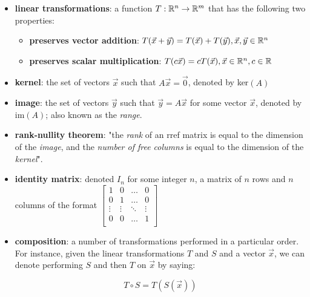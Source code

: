 \documentclass[12pt]{article}
\begin{document}
{{\begin{itemize}
        Note that in either view, the answers are equivalent, and using one view or the other simply helps make particular operations easier.
        
        \item \textbf{linear transformations}: a function $T: \mathbb{R}^n \to \mathbb{R}^m$ that has the following two properties:
        \begin{itemize}
            \item \textbf{preserves vector addition}: $T(\Vec{x} + \Vec{y}) = T(\Vec{x}) + T(\Vec{y}), \Vec{x}, \Vec{y} \in \mathbb{R}^n$
            \item \textbf{preserves scalar multiplication}: $T(c \Vec{x}) = c T(\Vec{x}), \Vec{x}\in\mathbb{R}^n, c\in\mathbb{R}$
        \end{itemize}
        
        \item \textbf{kernel}: the set of vectors $\Vec{x}$ such that $A\Vec{x} = \Vec{0}$, denoted by ker$(A)$
        
        \item \textbf{image}: the set of vectors $\Vec{y}$ such that $\Vec{y} = A\Vec{x}$ for some vector $\Vec{x}$, denoted by im$(A)$; also known as the \textit{range}.
        
        \item \textbf{rank-nullity theorem}: "the \textit{rank} of an rref matrix is equal to the dimension of the \textit{image}, and the \textit{number of free columns} is equal to the dimension of the \textit{kernel}".
        
        \item \textbf{identity matrix}: denoted $I_n$ for some integer $n$, a matrix of $n$ rows and $n$ columns of the format $\begin{bmatrix}
        1 & 0 & \dots & 0\\
        0 & 1 & \dots & 0\\
        \vdots & \vdots & \ddots & \vdots \\
        0 & 0 & \dots & 1 \\
        \end{bmatrix}$

        \item \textbf{composition}: a number of transformations performed in a particular order. For instance, given the linear transformations $T$ and $S$ and a vector $\vec{x}$, we can denote performing $S$ and then $T$ on $\vec{x}$ by saying:
        
        $$T \circ S = T(S(\vec{x}))$$


\end{itemize}}}
\end{document}
